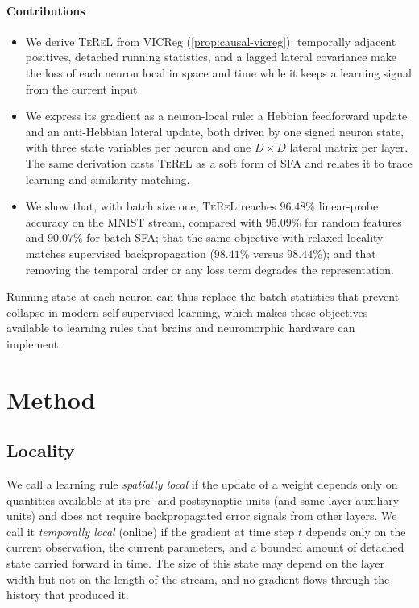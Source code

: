 \documentclass[11pt]{article}
\newcommand{\TeReL}{\textsc{TeReL}}
\newcommand{\FinalTeReLAccuracy}{96.48}
\newcommand{\FinalOfflineAccuracy}{98.41}
\newcommand{\FinalSupervisedAccuracy}{98.44}
\begin{document}
\paragraph{Contributions}
\begin{itemize}
  \item We derive \TeReL{} from VICReg (\cref{prop:causal-vicreg}): temporally
  adjacent positives, detached running statistics, and a lagged lateral
  covariance make the loss of each neuron local in space and time while it
  keeps a learning signal from the current input.
  \item We express its gradient as a neuron-local rule: a Hebbian feedforward
  update and an anti-Hebbian lateral update, both driven by one signed neuron
  state, with three state variables per neuron and one $D\times D$ lateral
  matrix per layer. The same derivation casts \TeReL{} as a soft form of SFA
  and relates it to trace learning and similarity matching.
  \item We show that, with batch size one, \TeReL{} reaches
  $\FinalTeReLAccuracy$\% linear-probe accuracy on the MNIST stream, compared
  with $95.09$\% for random features and $90.07$\% for batch SFA; that the same
  objective with relaxed locality matches supervised backpropagation
  ($\FinalOfflineAccuracy$\% versus $\FinalSupervisedAccuracy$\%); and that
  removing the temporal order or any loss term degrades the representation.
\end{itemize}

Running state at each neuron can thus replace the batch statistics that
prevent collapse in modern self-supervised learning, which makes these
objectives available to learning rules that brains and neuromorphic hardware
can implement.

\section{Method}
\label{sec:method}

\subsection{Locality}

We call a learning rule \emph{spatially local} if the update of a weight
depends only on quantities available at its pre- and postsynaptic units (and
same-layer auxiliary units) and does not require backpropagated error signals
from other layers. We call it \emph{temporally local} (online) if the gradient
at time step $t$ depends only on the current observation, the current
parameters, and a bounded amount of detached state carried forward in time.
The size of this state may depend on the layer width but not on the length of
the stream, and no gradient flows through the history that produced it.
\end{document}
